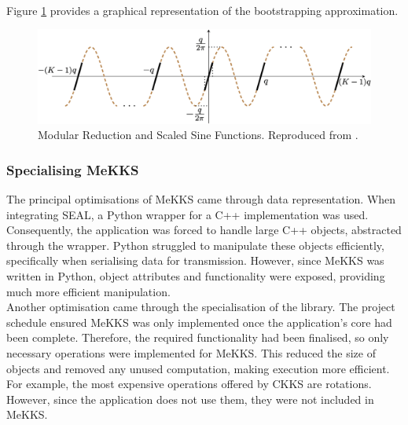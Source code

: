 \smallskip \\ \indent
Figure \ref{fig:bootstrapping} provides a graphical representation of the bootstrapping approximation.
\begin{figure}[ht]
    \centering
    \includegraphics[scale=0.25]{figures/bootstrapping.png}
    \caption[Bootstrapping Procedure]{Modular Reduction and Scaled Sine Functions. Reproduced from \cite{BootstrappingHEAAN}.}
    \label{fig:bootstrapping}
\end{figure}
\subsubsection{Specialising MeKKS}
\indent \indent
The principal optimisations of MeKKS came through data representation. When integrating SEAL, a Python wrapper for a C++ implementation was used. Consequently, the application was forced to handle large C++ objects, abstracted through the wrapper. Python struggled to manipulate these objects efficiently, specifically when serialising data for transmission. However, since MeKKS was written in Python, object attributes and functionality were exposed, providing much more efficient manipulation.
\smallskip \\ \indent
Another optimisation came through the specialisation of the library. The project schedule ensured MeKKS was only implemented once the application's core had been complete. Therefore, the required functionality had been finalised, so only necessary operations were implemented for MeKKS. This reduced the size of objects and removed any unused computation, making execution more efficient. For example, the most expensive operations offered by CKKS are rotations. However, since the application does not use them, they were not included in MeKKS.




